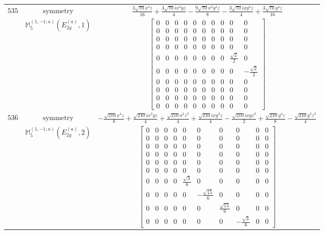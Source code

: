 \documentclass[fleqn,8pt,landscape]{jsarticle}
\begin{document}
\begin{longtable}{ccc}
$ 535 $ & $ \text{symmetry} $ & $ \frac{3 \sqrt{70} x^{4} z}{16} + \frac{3 \sqrt{70} i x^{3} y z}{4} - \frac{9 \sqrt{70} x^{2} y^{2} z}{8} - \frac{3 \sqrt{70} i x y^{3} z}{4} + \frac{3 \sqrt{70} y^{4} z}{16} $ \\
$  $ & $ \mathbb{M}_{5}^{(1,-1;a)}(E_{2g}^{(a)},1) $ & $ \begin{bmatrix} 0 & 0 & 0 & 0 & 0 & 0 & 0 & 0 & 0 & 0 \\ 0 & 0 & 0 & 0 & 0 & 0 & 0 & 0 & 0 & 0 \\ 0 & 0 & 0 & 0 & 0 & 0 & 0 & 0 & 0 & 0 \\ 0 & 0 & 0 & 0 & 0 & 0 & 0 & 0 & 0 & 0 \\ 0 & 0 & 0 & 0 & 0 & 0 & 0 & 0 & \frac{\sqrt{2}}{2} & 0 \\ 0 & 0 & 0 & 0 & 0 & 0 & 0 & 0 & 0 & - \frac{\sqrt{2}}{2} \\ 0 & 0 & 0 & 0 & 0 & 0 & 0 & 0 & 0 & 0 \\ 0 & 0 & 0 & 0 & 0 & 0 & 0 & 0 & 0 & 0 \\ 0 & 0 & 0 & 0 & 0 & 0 & 0 & 0 & 0 & 0 \\ 0 & 0 & 0 & 0 & 0 & 0 & 0 & 0 & 0 & 0 \end{bmatrix} $ \\ \hline
$ 536 $ & $ \text{symmetry} $ & $ - \frac{\sqrt{210} x^{4} z}{8} + \frac{\sqrt{210} i x^{3} y z}{4} + \frac{\sqrt{210} x^{2} z^{3}}{4} + \frac{\sqrt{210} i x y^{3} z}{4} - \frac{\sqrt{210} i x y z^{3}}{2} + \frac{\sqrt{210} y^{4} z}{8} - \frac{\sqrt{210} y^{2} z^{3}}{4} $ \\
$  $ & $ \mathbb{M}_{5}^{(1,-1;a)}(E_{2g}^{(a)},2) $ & $ \begin{bmatrix} 0 & 0 & 0 & 0 & 0 & 0 & 0 & 0 & 0 & 0 \\ 0 & 0 & 0 & 0 & 0 & 0 & 0 & 0 & 0 & 0 \\ 0 & 0 & 0 & 0 & 0 & 0 & 0 & 0 & 0 & 0 \\ 0 & 0 & 0 & 0 & 0 & 0 & 0 & 0 & 0 & 0 \\ 0 & 0 & 0 & 0 & 0 & 0 & 0 & 0 & 0 & 0 \\ 0 & 0 & 0 & 0 & 0 & 0 & 0 & 0 & 0 & 0 \\ 0 & 0 & 0 & 0 & \frac{\sqrt{3}}{6} & 0 & 0 & 0 & 0 & 0 \\ 0 & 0 & 0 & 0 & 0 & - \frac{\sqrt{15}}{6} & 0 & 0 & 0 & 0 \\ 0 & 0 & 0 & 0 & 0 & 0 & \frac{\sqrt{15}}{6} & 0 & 0 & 0 \\ 0 & 0 & 0 & 0 & 0 & 0 & 0 & - \frac{\sqrt{3}}{6} & 0 & 0 \end{bmatrix} $ \\ \hline

\end{longtable}
\end{document}
